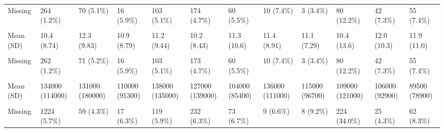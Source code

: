 \documentclass[
  single column]{article}
\begin{document}
\begin{landscape}
\begin{longtable}[t]{llllllllllll}
Missing & 264 (1.2\%) & 70 (5.1\%) & 16 (5.9\%) & 103 (5.1\%) & 174 (4.7\%) & 60 (5.5\%) & 10 (7.4\%) & 3 (3.4\%) & 80 (12.2\%) & 42 (7.3\%) & 55 (7.4\%)\\
\cellcolor{gray!10}{hours\_housework} & \cellcolor{gray!10}{} & \cellcolor{gray!10}{} & \cellcolor{gray!10}{} & \cellcolor{gray!10}{} & \cellcolor{gray!10}{} & \cellcolor{gray!10}{} & \cellcolor{gray!10}{} & \cellcolor{gray!10}{} & \cellcolor{gray!10}{} & \cellcolor{gray!10}{} & \cellcolor{gray!10}{}\\
Mean (SD) & 10.4 (8.74) & 12.3 (9.83) & 10.9 (8.79) & 11.2 (9.44) & 10.2 (8.43) & 11.3 (10.6) & 11.4 (8.91) & 11.1 (7.29) & 10.4 (13.6) & 12.0 (10.3) & 11.9 (11.0)\\
\cellcolor{gray!10}{Median [Min, Max]} & \cellcolor{gray!10}{10.0 [0, 168]} & \cellcolor{gray!10}{10.0 [0, 105]} & \cellcolor{gray!10}{10.0 [0, 80.0]} & \cellcolor{gray!10}{10.0 [0, 130]} & \cellcolor{gray!10}{8.00 [0, 168]} & \cellcolor{gray!10}{10.0 [0, 168]} & \cellcolor{gray!10}{10.0 [0, 40.0]} & \cellcolor{gray!10}{10.0 [0, 40.0]} & \cellcolor{gray!10}{7.00 [0, 168]} & \cellcolor{gray!10}{10.0 [0, 100]} & \cellcolor{gray!10}{10.0 [0, 100]}\\
\addlinespace
Missing & 262 (1.2\%) & 71 (5.2\%) & 16 (5.9\%) & 103 (5.1\%) & 173 (4.7\%) & 60 (5.5\%) & 10 (7.4\%) & 3 (3.4\%) & 80 (12.2\%) & 42 (7.3\%) & 55 (7.4\%)\\
\cellcolor{gray!10}{household\_inc} & \cellcolor{gray!10}{} & \cellcolor{gray!10}{} & \cellcolor{gray!10}{} & \cellcolor{gray!10}{} & \cellcolor{gray!10}{} & \cellcolor{gray!10}{} & \cellcolor{gray!10}{} & \cellcolor{gray!10}{} & \cellcolor{gray!10}{} & \cellcolor{gray!10}{} & \cellcolor{gray!10}{}\\
Mean (SD) & 134000 (114000) & 131000 (180000) & 110000 (91300) & 138000 (135000) & 127000 (139000) & 104000 (85400) & 136000 (111000) & 115000 (96700) & 109000 (121000) & 106000 (92900) & 89500 (78900)\\
\cellcolor{gray!10}{Median [Min, Max]} & \cellcolor{gray!10}{110000 [0, 2500000]} & \cellcolor{gray!10}{90000 [0, 4000000]} & \cellcolor{gray!10}{90000 [0, 670000]} & \cellcolor{gray!10}{110000 [0, 2800000]} & \cellcolor{gray!10}{100000 [0, 5000000]} & \cellcolor{gray!10}{80000 [0, 900000]} & \cellcolor{gray!10}{120000 [0, 700000]} & \cellcolor{gray!10}{99000 [20000, 600000]} & \cellcolor{gray!10}{90000 [0, 2000000]} & \cellcolor{gray!10}{80000 [8500, 1000000]} & \cellcolor{gray!10}{70000 [0, 900000]}\\
Missing & 1224 (5.7\%) & 59 (4.3\%) & 17 (6.3\%) & 119 (5.9\%) & 232 (6.3\%) & 73 (6.7\%) & 9 (6.6\%) & 8 (9.2\%) & 224 (34.0\%) & 25 (4.3\%) & 62 (8.3\%)\\

\end{longtable}
\end{landscape}
\end{document}
